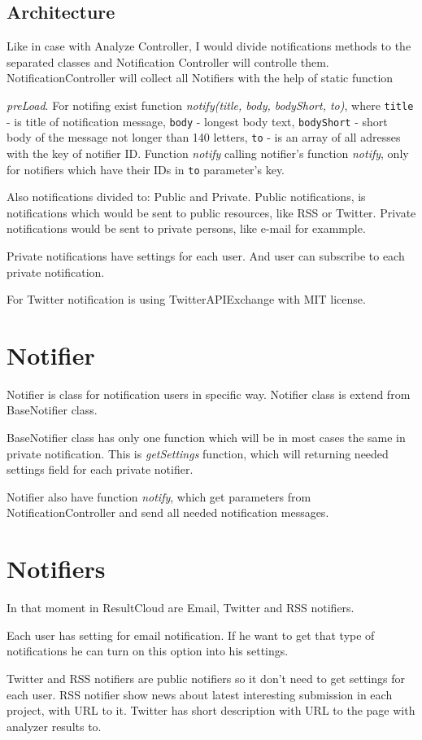 \section{Architecture}

Like in case with Analyze Controller, I would divide notifications methods to the separated classes and Notification Controller will controlle them. NotificationController will collect all Notifiers with the help of static function 

\emph{preLoad}. For notifing exist function \emph{notify(title, body, bodyShort, to)}, where \texttt{title} - is title of notification message, \texttt{body} - longest body text, \texttt{bodyShort} - short body of the message not longer than 140 letters, \texttt{to} - is an array of all adresses with the key of notifier ID. Function \emph{notify} calling notifier's function \emph{notify}, only for notifiers which have their IDs in \texttt{to} parameter's key.

Also notifications divided to: Public and Private. Public notifications, is notifications which would be sent to public resources, like RSS or Twitter. Private notifications would be sent to private persons, like e-mail for exammple.

Private notifications have settings for each user. And user can subscribe to each private notification.

For Twitter notification is using TwitterAPIExchange with MIT license.

\chapter{Notifier}

Notifier is class for notification users in specific way. Notifier class is extend from BaseNotifier class.

BaseNotifier class has only one function which will be in most cases the same in private notification. This is \emph{getSettings} function, which will returning needed settings field for each private notifier. 

Notifier also have function \emph{notify}, which get parameters from NotificationController and send all needed notification messages.

\chapter{Notifiers}

In that moment in ResultCloud are Email, Twitter and RSS notifiers.

Each user has setting for email notification. If he want to get that type of notifications he can turn on this option into his settings. 

Twitter and RSS notifiers are public notifiers so it don't need to get settings for each user. RSS notifier show news about latest interesting submission in each project, with URL to it. Twitter has short description with URL to the page with analyzer results to.
